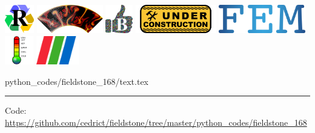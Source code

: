 \noindent
\includegraphics[height=1.25cm]{images/pictograms/replication}
\includegraphics[height=1.25cm]{images/pictograms/aspect_logo}
\includegraphics[height=1.25cm]{images/pictograms/benchmark}
\includegraphics[height=1.25cm]{images/pictograms/under_construction}
\includegraphics[height=1.25cm]{images/pictograms/FEM}
\includegraphics[height=1.25cm]{images/pictograms/temperature}
\includegraphics[height=1.25cm]{images/pictograms/paraview}


\begin{flushright} {\tiny {\color{gray} python\_codes/fieldstone\_168/text.tex}} \end{flushright}

%

\par\noindent\rule{\textwidth}{0.4pt}

\begin{center}
\inpython
{\small Code: \url{https://github.com/cedrict/fieldstone/tree/master/python_codes/fieldstone_168}}
\end{center}


